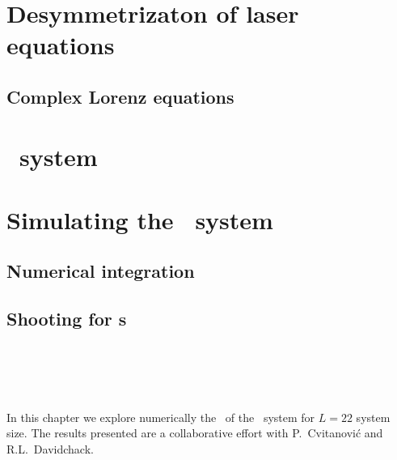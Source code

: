 \chapter{Desymmetrizaton of laser equations}
\label{chap:lasers}

 \section{Complex Lorenz equations}
    \label{sec:CLe}
    

\chapter{\KS\ system}
\label{chap:KSe}
    \section{\KSe}
    \label{sec:KSe}
    


\chapter{Simulating the \KS\ system}
\label{chap:Numerics}
\section{Numerical integration}
	
\section{Shooting for \rpo s}
        
        


\chapter{\KS\ \statesp}
\label{chap:kseStSp}

In this chapter we explore  numerically the \statesp\ of the \KS\ system
for $L=22$ system size.
The results presented are a
collaborative effort with P.~Cvitanovi\'c and R.L.~Davidchack.

